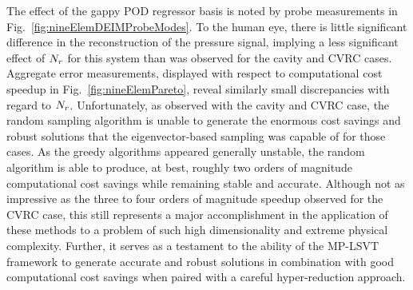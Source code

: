 The effect of the gappy POD regressor basis is noted by probe measurements in Fig.~\ref{fig:nineElemDEIMProbeModes}. To the human eye, there is little significant difference in the reconstruction of the pressure signal, implying a less significant effect of $N_r$ for this system than was observed for the cavity and CVRC cases. Aggregate error measurements, displayed with respect to computational cost speedup in Fig.~\ref{fig:nineElemPareto}, reveal similarly small discrepancies with regard to $N_r$. Unfortunately, as observed with the cavity and CVRC case, the random sampling algorithm is unable to generate the enormous cost savings and robust solutions that the eigenvector-based sampling was capable of for those cases. As the greedy algorithms appeared generally unstable, the random algorithm is able to produce, at best, roughly two orders of magnitude computational cost savings while remaining stable and accurate. Although not as impressive as the three to four orders of magnitude speedup observed for the CVRC case, this still represents a major accomplishment in the application of these methods to a problem of such high dimensionality and extreme physical complexity. Further, it serves as a testament to the ability of the MP-LSVT framework to generate accurate and robust solutions in combination with good computational cost savings when paired with a careful hyper-reduction approach.